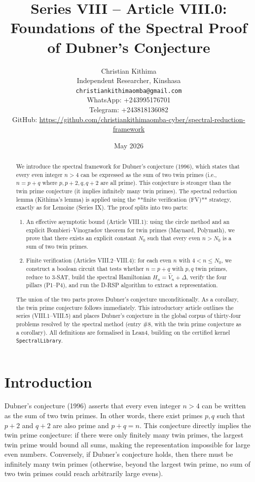 \documentclass[11pt,a4paper]{article}
\title{Series VIII – Article VIII.0: Foundations of the Spectral Proof of Dubner's Conjecture}
\author{Christian Kithima \\
Independent Researcher, Kinshasa \\
\texttt{christiankithimaomba@gmail.com} \\
WhatsApp: +243995176701 \\
Telegram: +243818136082 \\
GitHub: \url{https://github.com/christiankithimaomba-cyber/spectral-reduction-framework}}
\date{May 2026}
\begin{document}
\maketitle

\begin{abstract}
We introduce the spectral framework for Dubner's conjecture (1996), which states that every even integer \(n > 4\) can be expressed as the sum of two twin primes (i.e., \(n = p + q\) where \(p, p+2, q, q+2\) are all prime). This conjecture is stronger than the twin prime conjecture (it implies infinitely many twin primes). The spectral reduction lemma (Kithima's lemma) is applied using the **finite verification (FV)** strategy, exactly as for Lemoine (Series IX). The proof splits into two parts:
\begin{enumerate}
\item An effective asymptotic bound (Article VIII.1): using the circle method and an explicit Bombieri–Vinogradov theorem for twin primes (Maynard, Polymath), we prove that there exists an explicit constant \(N_0\) such that every even \(n > N_0\) is a sum of two twin primes.
\item Finite verification (Articles VIII.2–VIII.4): for each even \(n\) with \(4 < n \le N_0\), we construct a boolean circuit that tests whether \(n = p+q\) with \(p,q\) twin primes, reduce to 3‑SAT, build the spectral Hamiltonian \(H_n = \hat{V}_n + \Delta\), verify the four pillars (P1–P4), and run the D‑RSP algorithm to extract a representation.
\end{enumerate}
The union of the two parts proves Dubner's conjecture unconditionally. As a corollary, the twin prime conjecture follows immediately. This introductory article outlines the series (VIII.1–VIII.5) and places Dubner's conjecture in the global corpus of thirty‑four problems resolved by the spectral method (entry \#8, with the twin prime conjecture as a corollary). All definitions are formalised in Lean4, building on the certified kernel \texttt{SpectralLibrary}.
\end{abstract}

\tableofcontents

\section{Introduction}

Dubner's conjecture (1996) asserts that every even integer \(n > 4\) can be written as the sum of two twin primes. In other words, there exist primes \(p,q\) such that \(p+2\) and \(q+2\) are also prime and \(p+q = n\). This conjecture directly implies the twin prime conjecture: if there were only finitely many twin primes, the largest twin prime would bound all sums, making the representation impossible for large even numbers. Conversely, if Dubner's conjecture holds, then there must be infinitely many twin primes (otherwise, beyond the largest twin prime, no sum of two twin primes could reach arbitrarily large evens).
\end{document}
